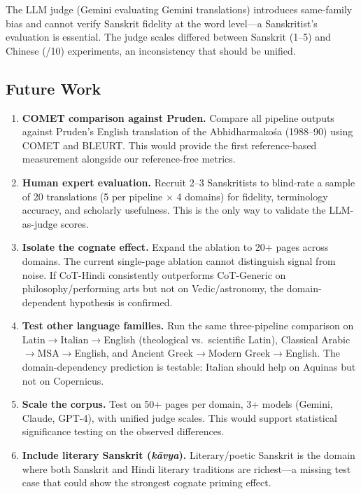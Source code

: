 \documentclass[10pt,twocolumn]{article}
\begin{document}
The LLM judge (Gemini evaluating Gemini translations) introduces same-family bias and cannot verify Sanskrit fidelity at the word level---a Sanskritist's evaluation is essential. The judge scales differed between Sanskrit (1--5) and Chinese (/10) experiments, an inconsistency that should be unified.

\subsection{Future Work}

\begin{enumerate}
\item \textbf{COMET comparison against Pruden.} Compare all pipeline outputs against Pruden's English translation of the Abhidharmako\'sa (1988--90) using COMET and BLEURT. This would provide the first reference-based measurement alongside our reference-free metrics.
\item \textbf{Human expert evaluation.} Recruit 2--3 Sanskritists to blind-rate a sample of 20 translations (5 per pipeline $\times$ 4 domains) for fidelity, terminology accuracy, and scholarly usefulness. This is the only way to validate the LLM-as-judge scores.
\item \textbf{Isolate the cognate effect.} Expand the ablation to 20+ pages across domains. The current single-page ablation cannot distinguish signal from noise. If CoT-Hindi consistently outperforms CoT-Generic on philosophy/performing arts but not on Vedic/astronomy, the domain-dependent hypothesis is confirmed.
\item \textbf{Test other language families.} Run the same three-pipeline comparison on Latin$\to$Italian$\to$English (theological vs.\ scientific Latin), Classical Arabic$\to$MSA$\to$English, and Ancient Greek$\to$Modern Greek$\to$English. The domain-dependency prediction is testable: Italian should help on Aquinas but not on Copernicus.
\item \textbf{Scale the corpus.} Test on 50+ pages per domain, 3+ models (Gemini, Claude, GPT-4), with unified judge scales. This would support statistical significance testing on the observed differences.
\item \textbf{Include literary Sanskrit (\emph{k\=avya}).} Literary/poetic Sanskrit is the domain where both Sanskrit and Hindi literary traditions are richest---a missing test case that could show the strongest cognate priming effect.
\end{enumerate}

\end{document}

